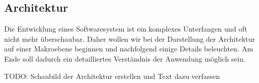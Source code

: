 \subsection{Architektur}
\label{subsec:architecture}

Die Entwicklung eines Softwaresystem ist ein komplexes Unterfangen und oft nicht mehr überschaubar.
Daher wollen wir bei der Darstellung der Architektur auf einer Makroebene beginnen und nachfolgend einige Details beleuchten.
Am Ende soll dadurch ein detailliertes Verständnis der Anwendung möglich sein.

TODO: Schaubild der Architektur erstellen und Text dazu verfassen
